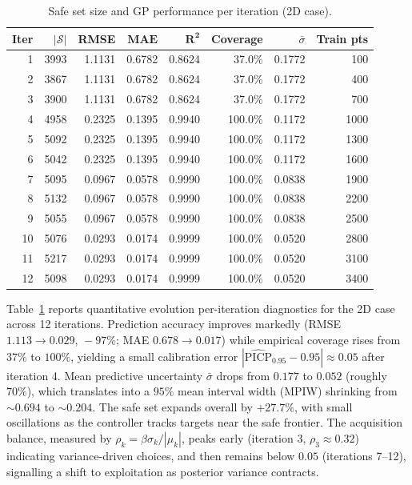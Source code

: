 \documentclass[10pt]{article}
\newcommand{\1}{\mathbbm{1}}
\begin{document}
\begin{table}[H]
  \centering
  \caption{Safe set size and GP performance per iteration (2D case).}
  \label{tab:iter-metrics-2d}
  \setlength{\tabcolsep}{2pt}
  \small
  \begin{tabular}{r r r r r r r r}
    \toprule
    \textbf{Iter} & \(|\mathcal{S}|\) & \textbf{RMSE} & \(\mathbf{MAE}\) & \(\mathbf{R^2}\) & \textbf{Coverage} & \(\bar{\sigma}\) & \textbf{Train pts} \\
    \midrule
     1 & 3993 & 1.1131 & 0.6782 & 0.8624 & 37.0\%  & 0.1772 &  100 \\
     2 & 3867 & 1.1131 & 0.6782 & 0.8624 & 37.0\%  & 0.1772 &  400 \\
     3 & 3900 & 1.1131 & 0.6782 & 0.8624 & 37.0\%  & 0.1772 &  700 \\
     4 & 4958 & 0.2325 & 0.1395 & 0.9940 & 100.0\% & 0.1172 & 1000 \\
     5 & 5092 & 0.2325 & 0.1395 & 0.9940 & 100.0\% & 0.1172 & 1300 \\
     6 & 5042 & 0.2325 & 0.1395 & 0.9940 & 100.0\% & 0.1172 & 1600 \\
     7 & 5095 & 0.0967 & 0.0578 & 0.9990 & 100.0\% & 0.0838 & 1900 \\
     8 & 5132 & 0.0967 & 0.0578 & 0.9990 & 100.0\% & 0.0838 & 2200 \\
     9 & 5055 & 0.0967 & 0.0578 & 0.9990 & 100.0\% & 0.0838 & 2500 \\
    10 & 5076 & 0.0293 & 0.0174 & 0.9999 & 100.0\% & 0.0520 & 2800 \\
    11 & 5217 & 0.0293 & 0.0174 & 0.9999 & 100.0\% & 0.0520 & 3100 \\
    12 & 5098 & 0.0293 & 0.0174 & 0.9999 & 100.0\% & 0.0520 & 3400 \\
    \bottomrule
  \end{tabular}
\end{table}


Table~\ref{tab:iter-metrics-2d} reports quantitative evolution per-iteration diagnostics for the 2D case across 12 iterations. 
Prediction accuracy improves markedly (RMSE $1.113\!\to\!0.029$, $\!-97\%$; MAE $0.678\!\to\!0.017$) while empirical coverage rises from $37\%$ to $100\%$, yielding a small calibration error $|\widehat{\mathrm{PICP}}_{0.95}-0.95|\approx 0.05$ after iteration 4. 
Mean predictive uncertainty $\bar\sigma$ drops from $0.177$ to $0.052$ (roughly $70\%$), which translates into a $95\%$ mean interval width (MPIW) shrinking from $\sim0.694$ to $\sim0.204$. 
The safe set expands overall by $+27.7\%$, with small oscillations as the controller tracks targets near the safe frontier. 
The acquisition balance, measured by $\rho_k=\beta\sigma_k/|\mu_k|$, peaks early (iteration 3, $\rho_3\approx 0.32$) indicating variance-driven choices, and then remains below $0.05$ (iterations 7–12), signalling a shift to exploitation as posterior variance contracts.
\end{document}
